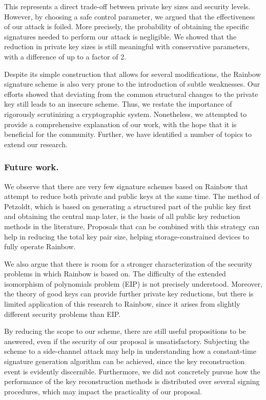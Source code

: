 \documentclass[12pt, a4paper, oneside]{memoir}
\theoremstyle{definition}
\begin{document}
This represents a direct trade-off between private key sizes and security levels. However, by choosing a safe control parameter, we argued that the effectiveness of our attack is foiled. More precisely, the probability of obtaining the specific signatures needed to perform our attack is negligible. We showed that the reduction in private key sizes is still meaningful with conservative parameters, with a difference of up to a factor of 2.

Despite its simple construction that allows for several modifications, the Rainbow signature scheme is also very prone to the introduction of subtle weaknesses. Our efforts showed that deviating from the common structural changes to the private key still leads to an insecure scheme. Thus, we restate the importance of rigorously scrutinizing a cryptographic system. Nonetheless, we attempted to provide a comprehensive explanation of our work, with the hope that it is beneficial for the community. Further, we have identified a number of topics to extend our research. 

\subsubsection{Future work.}

We observe that there are very few signature schemes based on Rainbow that attempt to reduce both private and public keys at the same time. The method of Petzoldt, which is based on generating a structured part of the public key first and obtaining the central map later, is the basis of all public key reduction methods in the literature. Proposals that can be combined with this strategy can help in reducing the total key pair size, helping storage-constrained devices to fully operate Rainbow.

We also argue that there is room for a stronger characterization of the security problems in which Rainbow is based on. The difficulty of the extended isomorphism of polynomials problem (EIP) is not precisely understood. Moreover, the theory of good keys can provide further private key reductions, but there is limited application of this research to Rainbow, since it arises from slightly different security problems than EIP. 

By reducing the scope to our scheme, there are still useful propositions to be answered, even if the security of our proposal is unsatisfactory. Subjecting the scheme to a side-channel attack may help in understanding how a constant-time signature generation algorithm can be achieved, since the key reconstruction event is evidently discernible. Furthermore, we did not concretely pursue how the performance of the key reconstruction methods is distributed over several signing procedures, which may impact the practicality of our proposal.
\end{document}
